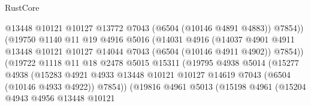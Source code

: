 \begin{lexlean}{RustCore}
\begin{coremodule}
                                    @13448
                                    @10121
                                    @10127
                                    @13772
                                    @7043
                                    (@6504 (@10146 @4891 @4883))
                                    @7854))
                                (@19750
                                  @1140
                                  @11
                                  @19
                                  @4916
                                  @5016
                                  (@14031
                                    @4916
                                    (@14037
                                      @4901
                                      @4911
                                      @13448
                                      @10121
                                      @10127
                                      @14044
                                      @7043
                                      (@6504 (@10146 @4911 @4902))
                                      @7854))
                                  (@19722
                                    @1118
                                    @11
                                    @18
                                    @2478
                                    @5015
                                    @15311
                                    (@19795
                                      @4938
                                      @5014
                                      (@15277
                                        @4938
                                        (@15283
                                          @4921
                                          @4933
                                          @13448
                                          @10121
                                          @10127
                                          @14619
                                          @7043
                                          (@6504 (@10146 @4933 @4922))
                                          @7854))
                                      (@19816
                                        @4961
                                        @5013
                                        (@15198
                                          @4961
                                          (@15204
                                            @4943
                                            @4956
                                            @13448
                                            @10121

\end{coremodule}
\end{lexlean}
